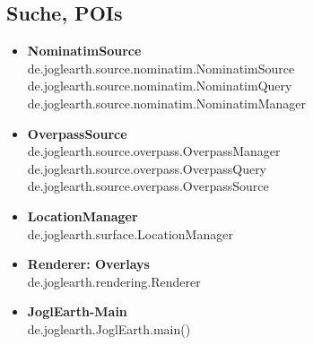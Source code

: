 \documentclass[10pt]{scrreprt}
\begin{document}
\subsection*{Suche, POIs}
\begin{itemize}
\item \textbf{NominatimSource}\\
de.joglearth.source.nominatim.NominatimSource\\
de.joglearth.source.nominatim.NominatimQuery\\
de.joglearth.source.nominatim.NominatimManager
\item \textbf{OverpassSource}\\
de.joglearth.source.overpass.OverpassManager\\
de.joglearth.source.overpass.OverpassQuery\\
de.joglearth.source.overpass.OverpassSource
\item \textbf{LocationManager}\\
de.joglearth.surface.LocationManager
\item \textbf{Renderer: Overlays}\\
de.joglearth.rendering.Renderer
\item \textbf{JoglEarth-Main}\\
de.joglearth.JoglEarth.main()
\end{itemize}

\newpage
\end{document}

